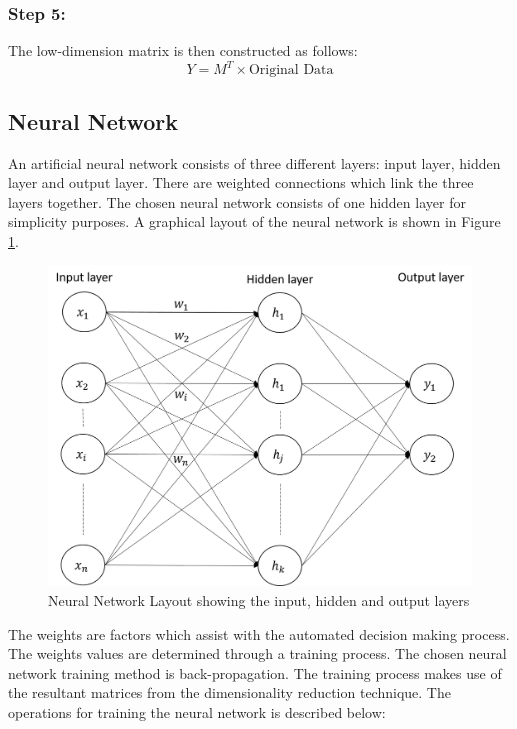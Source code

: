 \documentclass[11pt,twocolumn]{witseiepaper}
\begin{document}
	\subsubsection{Step 5:} The low-dimension matrix is then constructed as follows:
	\begin{equation}
		Y = M^T \times \text{Original Data}
	\end{equation}
	
	\subsection{Neural Network}
	An artificial neural network consists of three different layers: input layer, hidden layer and output layer. There are weighted connections which link the three layers together. The chosen neural network consists of one hidden layer for simplicity purposes. 
	A graphical layout of the neural network is shown in Figure \ref{fig: neural_network}.
	\begin{figure}[!h]
		\centering
		\includegraphics[scale=0.25]{neural_network.png}
		\caption{Neural Network Layout showing the input, hidden and output layers}
		\label{fig: neural_network}
	\end{figure}
	
	The weights are factors which assist with the automated decision making process. The weights values are determined through a training process. The chosen neural network training method is back-propagation. The training process makes use of the resultant matrices from the dimensionality reduction technique. The operations for training the neural network is described below:
	
\end{document}
